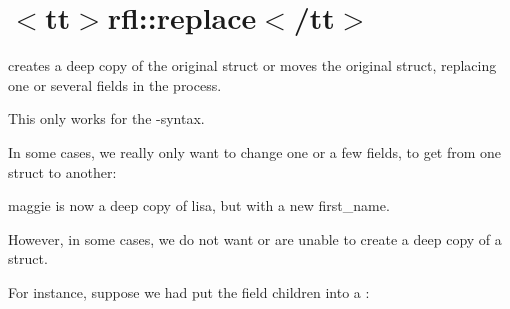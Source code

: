 \chapter{\texorpdfstring{$<$}{<}tt\texorpdfstring{$>$}{>}rfl\+::replace\texorpdfstring{$<$}{<}/tt\texorpdfstring{$>$}{>}}
\hypertarget{md_external_2reflect-cpp_2docs_2replace}{}\label{md_external_2reflect-cpp_2docs_2replace}
\label{md_external_2reflect-cpp_2docs_2replace_autotoc_md618}%
%


{\ttfamily {}} creates a deep copy of the original struct or moves the original struct, replacing one or several fields in the process.

This only works for the {\ttfamily {}}-\/syntax.

In some cases, we really only want to change one or a few fields, to get from one struct to another\+:


\begin{DoxyCode}{0}
\DoxyCodeLine{\};}
\DoxyCodeLine{}
\DoxyCodeLine{\textcolor{comment}{//\ Returns\ a\ deep\ copy\ of\ the\ original\ object,}}
\DoxyCodeLine{\textcolor{comment}{//\ replacing\ first\_name.}}

\end{DoxyCode}


{\ttfamily maggie} is now a deep copy of {\ttfamily lisa}, but with a new {\ttfamily first\+\_\+name}.

However, in some cases, we do not want or are unable to create a deep copy of a struct.

For instance, suppose we had put the field {\ttfamily children} into a {\ttfamily {}}\+:


